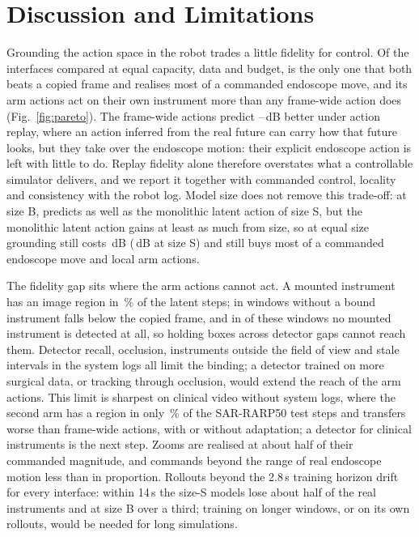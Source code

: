 \section{Discussion and Limitations}\label{sec:discussion}
Grounding the action space in the robot trades a little fidelity for control. Of the interfaces compared at equal capacity, data and budget, \method{} is the only one that both beats a copied frame and realises most of a commanded endoscope move, and its arm actions act on their own instrument more than any frame-wide action does (Fig.~\ref{fig:pareto}). The frame-wide actions predict --\,dB better under action replay, where an action inferred from the real future can carry how that future looks, but they take over the endoscope motion: their explicit endoscope action is left with little to do. Replay fidelity alone therefore overstates what a controllable simulator delivers, and we report it together with commanded control, locality and consistency with the robot log. Model size does not remove this trade-off: at size B, \method{} predicts as well as the monolithic latent action of size S, but the monolithic latent action gains at least as much from size, so at equal size grounding still costs \,dB (\,dB at size S) and still buys most of a commanded endoscope move and local arm actions.

The fidelity gap sits where the arm actions cannot act. A mounted instrument has an image region in \,\% of the latent steps; in windows without a bound instrument \method{} falls below the copied frame, and in  of these  windows no mounted instrument is detected at all, so holding boxes across detector gaps cannot reach them. Detector recall, occlusion, instruments outside the field of view and stale intervals in the system logs all limit the binding; a detector trained on more surgical data, or tracking through occlusion, would extend the reach of the arm actions. This limit is sharpest on clinical video without system logs, where the second arm has a region in only \,\% of the SAR-RARP50 test steps and \method{} transfers worse than frame-wide actions, with or without adaptation; a detector for clinical instruments is the next step. Zooms are realised at about half of their commanded magnitude, and commands beyond the range of real endoscope motion less than in proportion. Rollouts beyond the 2.8\,s training horizon drift for every interface: within 14\,s the size-S models lose about half of the real instruments and \method{} at size B over a third; training on longer windows, or on its own rollouts, would be needed for long simulations.

